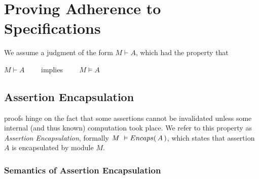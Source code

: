 \section{Proving Adherence to \SpecLang Specifications}
\label{s:inference}

%

\begin{axiom}
We assume a judgment of the form $M \vdash A$, which had the property that\\
\strut \hspace{5cm} $M \vdash A $ \ \ \ \ implies \ \ \ \ $M \vDash A$
\end{axiom}


\subsection {Assertion Encapsulation}
\label{s:encaps-proof}

{
{\SpecLang proofs  hinge on the fact that some assertions cannot be invalidated unless some 
} internal (and thus known)
computation took place. 
{We refer to this property as \emph{Assertion Encapsulation},}
}
formally $M\ \vDash  {\ensuremath Encaps(\, A\, )}$, which states that 
 assertion $A$ is encapsulated by module $M$.


\subsubsection{Semantics of Assertion Encapsulation}

